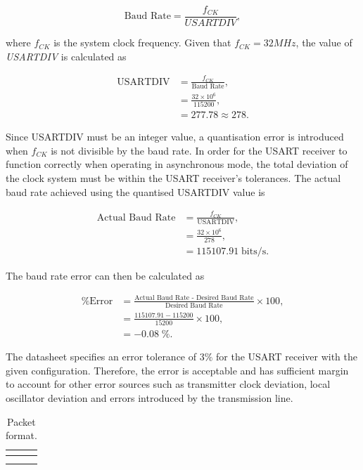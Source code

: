 \begin{equation}
	\text{Baud Rate}=\frac{f_{CK}}{\textit{USARTDIV}},
\end{equation}

where $f_{CK}$ is the system clock frequency. Given that $f_{CK}=32MHz$, the value of \textit{USARTDIV} is calculated as 

\begin{align}
	\text{USARTDIV}&=\frac{f_{CK}}{\text{Baud Rate}},\\
	&=\frac{32\times10^6}{115200},\\
	&=277.78\approx278.
\end{align} 

Since USARTDIV must be an integer value, a quantisation error is introduced when $f_{CK}$ is not divisible by
the baud rate. In order for the USART receiver to function correctly when operating in asynchronous mode, the total deviation of the clock system must be within the USART receiver's tolerances. The actual baud rate achieved using the quantised USARTDIV value is 

\begin{align}
	\text{Actual Baud Rate}&=\frac{f_{CK}}{\text{USARTDIV}},\\
	&=\frac{32\times10^6}{278},\\
	&=115107.91\;\text{bits/s}.
\end{align}

The baud rate error can then be calculated as

\begin{align}
	\text{\% Error}&=\frac{\text{Actual Baud Rate - Desired Baud Rate}}{\text{Desired Baud Rate}} \times 100,\\
	&=\frac{115107.91-115200}{15200} \times 100,\\
	&=-0.08\;\text{\%}.
\end{align}

The datasheet specifies an error tolerance of $3\%$ for the USART receiver with the given configuration. Therefore, the error is acceptable and has sufficient margin to account for other error sources such as transmitter clock deviation, local oscillator deviation and errors introduced by the transmission line.

\begin{table}[H]
	\renewcommand{\arraystretch}{1.3}
	\centering
	\begin{tabular}{|>{\raggedright}m{1.5cm}|>{\raggedright}m{3cm}|>{\raggedright\arraybackslash}m{10cm}|}
		\hline
		\textbf{} & \textbf{} & \textbf{} \\
		\hline
		\multicolumn{3}{|l|}{\textbf{}} \\
		\hline
		 & & \\
		\hline
	\end{tabular}
	\caption{\label{tab:packet-format}Packet format.}
\end{table}

